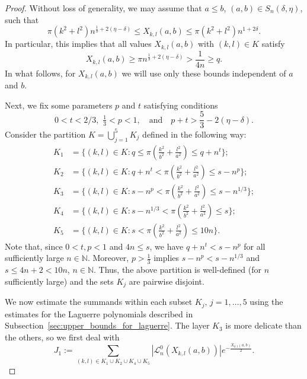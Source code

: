 \documentclass[11pt]{amsart}
\numberwithin{equation}{section}
\newcommand{\N}{{\mathbb N}}
\begin{document}
\begin{proof}
    Without loss of generality, we may assume that $a \leq b$, $(a,b) \in S_n(\delta, \eta)$, such that 
    \begin{equation}\label{eq:X_uniform_bounds_reminder}
        \pi (k^2 + l^2) n^{\frac{1}{3}+2(\eta - \delta)} 
        \leq X_{k,l}(a,b)
        \leq \pi (k^2 + l^2) n^{1+2\delta}.
    \end{equation}
    In particular, this implies that all values $ X_{k,l}(a,b)$ with $(k,l) \in K$ satisfy
    \begin{equation}\label{eq:min_point}
        X_{k,l}(a,b) \geq \pi n^{\frac{1}{3}+2(\eta - \delta)}>\frac{1}{4n}\geq q.
    \end{equation}
    In what follows,  for $X_{k,l}(a,b)$ we will use only these bounds independent of $a$ and $b$.
    
    Next, we fix some parameters $p$ and $t$ satisfying conditions
    \begin{equation}\label{eq:p_t_cond}
        0<t<2/3, \,\, \tfrac{1}{3}<p<1,\quad \text{and} \quad     p+t > \frac{5}{3}-2(\eta - \delta).   
    \end{equation}
    Consider the partition $K = \bigcup_{j=1}^5 K_j$ defined in the following way: 
    \begin{align}
        K_1 &= \{(k,l)\in K: q\leq \pi(\tfrac{k^2}{b^2}+\tfrac{l^2}{a^2})\leq q+n^{t}\}; \\
        K_2 &= \{(k,l)\in K: q+n^{t}< \pi(\tfrac{k^2}{b^2}+\tfrac{l^2}{a^2})\leq s-n^{p}\}; \\
        K_3 &= \{(k,l)\in K: s-n^{p}< \pi(\tfrac{k^2}{b^2}+\tfrac{l^2}{a^2})\leq s-n^{1/3}\}; \\
        K_4 &= \{(k,l)\in K: s-n^{1/3} <\pi(\tfrac{k^2}{b^2}+\tfrac{l^2}{a^2})\leq s\}; \\
        K_5 &= \{(k,l)\in K: s <\pi(\tfrac{k^2}{b^2}+\tfrac{l^2}{a^2})\leq {10}n\}.
    \end{align} 
    Note that, since $0<t,p<1$ and $4n \leq s$, we have $q+n^t<s-n^p$ for all sufficiently large $n\in\N$. Moreover, $p>\frac13$ implies $s-n^p<s-n^{1/3}$ and $s \leq 4n+2 < 10n$, $n \in \N$. Thus, the above partition is well-defined (for $n$ sufficiently large) and the sets $K_j$ are pairwise disjoint.
        
    We now estimate the summands within each subset $K_j, \, j=1, \dots,5$ using the estimates for the Laguerre polynomials described in Subsection~\ref{sec:upper_bounds_for_laguerre}. The layer $K_3$ is more delicate than the others, so we first deal with
    \begin{equation}
        J_1:=\sum_{(k,l)\in K_1\cup K_2 \cup K_4\cup K_5} |\mathcal{L}_n^{0}(X_{k,l}(a,b))|e^{-\frac{X_{k,l}(a,b)}{2}}.
    \end{equation}
    

\end{proof}
\end{document}
